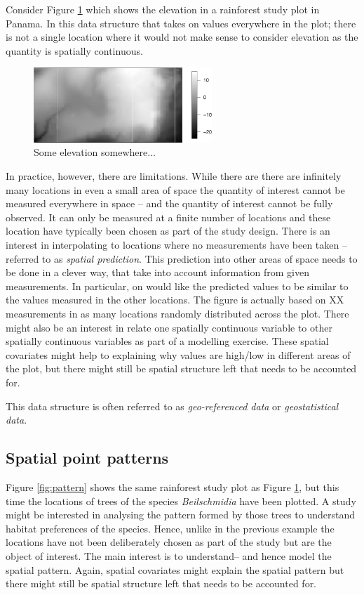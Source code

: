 \documentclass[authoryear]{book}
\theoremstyle{definition}
\begin{document}
Consider Figure \ref{fig:elev} which shows the elevation in a rainforest study plot in Panama. In this data structure that  takes on values everywhere in the plot; there is not a single location where it would not make sense to consider elevation as the quantity is spatially continuous.
\begin{figure}
\centering
\includegraphics[width=0.6\textwidth]{elev}
\caption{\label{fig:elev} Some elevation somewhere...}
\end{figure}
In practice, however, there are limitations. While there are there are infinitely many locations in even a small area of space the quantity of interest cannot be measured everywhere in space -- and the quantity of interest cannot be fully observed. It can only be measured at a finite number of locations and these location have typically been chosen as part of the study design. There is an interest in interpolating to locations where no measurements have been taken -- referred to as \textit{spatial prediction}. This prediction into other areas of space needs to be done in a clever way, that take into account information from given measurements. In particular, on would like the predicted values to be similar to the values measured in the other locations. The figure is actually based on XX measurements in as many locations randomly distributed across the plot. There might also be an interest in relate one spatially continuous variable to other spatially continuous variables as part of a modelling exercise. These spatial covariates might help to explaining why values are high/low in different areas of the plot, but there might still be spatial structure left that needs to be accounted for.

This data structure is often referred to as \textit{geo-referenced data} or \textit{geostatistical data}.

\subsection{Spatial point patterns}
Figure \ref{fig:pattern} shows  the same rainforest study plot as Figure \ref{fig:elev}, but this time the locations of trees of the species \textit{Beilschmidia} have been plotted. A study might be interested in analysing the pattern formed by those trees to understand habitat preferences of the species. Hence, unlike in the previous example the locations have not been deliberately chosen as part of the study but are the object of interest. The main interest is to understand-- and hence model the spatial pattern.
Again, spatial covariates might explain the spatial pattern but there might still be spatial structure left that needs to be accounted for.
\end{document}
